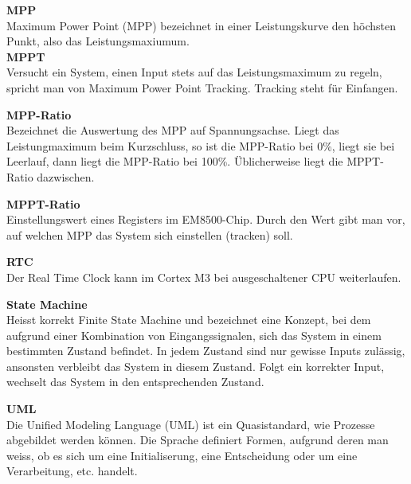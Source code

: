 \textbf{MPP}\\
\forceindent Maximum Power Point (MPP) bezeichnet in einer Leistungskurve den höchsten Punkt, also das Leistungsmaxiumum.\\

\textbf{MPPT}\\
\forceindent Versucht ein System, einen Input stets auf das Leistungsmaximum zu regeln, spricht man von Maximum Power Point Tracking. Tracking steht für Einfangen.

\textbf{MPP-Ratio}\\
\forceindent Bezeichnet die Auswertung des MPP auf Spannungsachse. Liegt das Leistungmaximum beim Kurzschluss, so ist die MPP-Ratio bei 0\thinspace\%, liegt sie bei Leerlauf, dann liegt die MPP-Ratio bei 100\thinspace\%. Üblicherweise liegt die MPPT-Ratio dazwischen.

\textbf{MPPT-Ratio}\\
\forceindent Einstellungswert eines Registers im EM8500-Chip. Durch den Wert gibt man vor, auf welchen MPP das System sich einstellen (tracken) soll.

\textbf{RTC}\\
\forceindent Der Real Time Clock kann im Cortex M3 bei ausgeschaltener CPU weiterlaufen.  

\textbf{State Machine}\\
\forceindent Heisst korrekt Finite State Machine und bezeichnet eine Konzept, bei dem aufgrund einer Kombination von Eingangssignalen, sich das System in einem bestimmten Zustand befindet. In jedem Zustand sind nur gewisse Inputs zulässig, ansonsten verbleibt das System in diesem Zustand. Folgt ein korrekter Input, wechselt das System in den entsprechenden Zustand. 

\textbf{UML}\\
\forceindent Die Unified Modeling Language (UML) ist ein Quasistandard, wie Prozesse abgebildet werden können. Die Sprache definiert Formen, aufgrund deren man weiss, ob es sich um eine Initialiserung, eine Entscheidung oder um eine Verarbeitung, etc. handelt.


\makeatletter
\renewcommand\listoffigures{%
    \section{\listfigurename}%
      \@mkboth{\listfigurename}%
              {\listfigurename}%
    \@starttoc{lof}%
}
\makeatother

